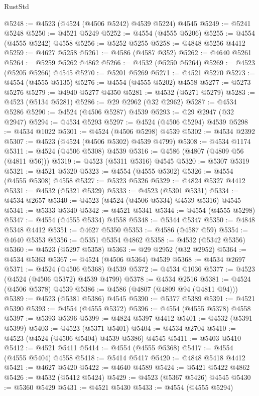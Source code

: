 \begin{lexlean}{RustStd}
\begin{coremodule}
@5248 := @4523 (@4524 (@4506 @5242) @4539 @5224) @4545
@5249 := @5241 @5248
@5250 := @4521 @5249
@5252 := @4554 (@4555 @5206)
@5255 := @4554 (@4555 @5242) @4558
@5256 := @5252 @5255
@5258 := @4848 @5256 @4412
@5259 := @4627 @5258
@5261 := @4586 (@4587 @352)
@5262 := @4640 @5261
@5264 := @5259 @5262 @4862
@5266 := @4532 (@5250 @5264)
@5269 := @4523 (@5205 @5266) @4545
@5270 := @5201 @5269
@5271 := @4521 @5270
@5273 := @4554 (@4555 @5135)
@5276 := @4554 (@4555 @5202) @4558
@5277 := @5273 @5276
@5279 := @4940 @5277 @4350
@5281 := @4532 (@5271 @5279)
@5283 := @4523 (@5134 @5281)
@5286 := @29 @2962 (@32 @2962)
@5287 := @4534 @5286
@5290 := @4524 (@4506 @5287) @4539
@5293 := @29 @2947 (@32 @2947)
@5294 := @4534 @5293
@5297 := @4524 (@4506 @5294) @4539
@5298 := @4534 @1022
@5301 := @4524 (@4506 @5298) @4539
@5302 := @4534 @2392
@5307 := @4523 (@4524 (@4506 @5302) @4539 @4799)
@5308 := @4534 @1174
@5311 := @4524 (@4506 @5308) @4539
@5316 := @4586 (@4807 (@4809 @56 (@4811 @56)))
@5319 := @4523 (@5311 @5316) @4545
@5320 := @5307 @5319
@5321 := @4521 @5320
@5323 := @4554 (@4555 @5302)
@5326 := @4554 (@4555 @5308) @4558
@5327 := @5323 @5326
@5329 := @4824 @5327 @4412
@5331 := @4532 (@5321 @5329)
@5333 := @4523 (@5301 @5331)
@5334 := @4534 @2657
@5340 := @4523 (@4524 (@4506 @5334) @4539 @5316) @4545
@5341 := @5333 @5340
@5342 := @4521 @5341
@5344 := @4554 (@4555 @5298)
@5347 := @4554 (@4555 @5334) @4558
@5348 := @5344 @5347
@5350 := @4848 @5348 @4412
@5351 := @4627 @5350
@5353 := @4586 (@4587 @59)
@5354 := @4640 @5353
@5356 := @5351 @5354 @4862
@5358 := @4532 (@5342 @5356)
@5360 := @4523 (@5297 @5358)
@5363 := @29 @2952 (@32 @2952)
@5364 := @4534 @5363
@5367 := @4524 (@4506 @5364) @4539
@5368 := @4534 @2697
@5371 := @4524 (@4506 @5368) @4539
@5372 := @4534 @1036
@5377 := @4523 (@4524 (@4506 @5372) @4539 @4799)
@5378 := @4534 @2516
@5381 := @4524 (@4506 @5378) @4539
@5386 := @4586 (@4807 (@4809 @94 (@4811 @94)))
@5389 := @4523 (@5381 @5386) @4545
@5390 := @5377 @5389
@5391 := @4521 @5390
@5393 := @4554 (@4555 @5372)
@5396 := @4554 (@4555 @5378) @4558
@5397 := @5393 @5396
@5399 := @4824 @5397 @4412
@5401 := @4532 (@5391 @5399)
@5403 := @4523 (@5371 @5401)
@5404 := @4534 @2704
@5410 := @4523 (@4524 (@4506 @5404) @4539 @5386) @4545
@5411 := @5403 @5410
@5412 := @4521 @5411
@5414 := @4554 (@4555 @5368)
@5417 := @4554 (@4555 @5404) @4558
@5418 := @5414 @5417
@5420 := @4848 @5418 @4412
@5421 := @4627 @5420
@5422 := @4640 @4589
@5424 := @5421 @5422 @4862
@5426 := @4532 (@5412 @5424)
@5429 := @4523 (@5367 @5426) @4545
@5430 := @5360 @5429
@5431 := @4521 @5430
@5433 := @4554 (@4555 @5294)

\end{coremodule}
\end{lexlean}
